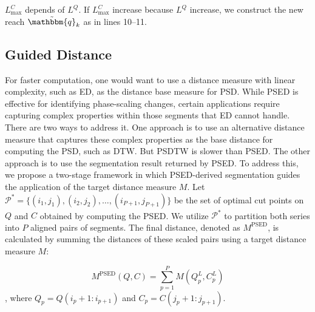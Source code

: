 $L_{\max}^C$ depends of $L^Q$.
If $L_{\max}^C$ increase because $L^Q$ increase, we construct the new reach $\tilde{\mathbbm{q}}_k$ as in lines 10--11.

\subsection{Guided Distance} %

For faster computation, one would want to use a distance measure with linear complexity, such as ED, as the distance base measure for PSD.
While PSED is effective for identifying phase-scaling changes, certain applications require capturing complex properties within those segments that ED cannot handle. 
There are two ways to address it.
One approach is to use an alternative distance measure that captures these complex properties as the base distance for computing the PSD, such as DTW.
But PSDTW is slower than PSED.
The other approach is to use the segmentation result returned by PSED. 
To address this, we propose a two-stage framework in which PSED-derived segmentation guides the application of the target distance measure $M$.
Let $\mathcal{P}^* = \{(i_1, j_1), (i_2, j_2), \dots, (i_{P+1}, j_{P+1})\}$ be the set of optimal cut points on $Q$ and $C$ obtained by computing the PSED. 
We utilize $\mathcal{P}^*$ to partition both series into $P$ aligned pairs of segments. 
The final distance, denoted as $M^{\text{PSED}}$, is calculated by summing the distances of these scaled pairs using a target distance measure $M$:

\begin{equation} 
\label{eq:guided-dist}
M^{\text{PSED}}(Q, C) = \sum_{p=1}^{P} M(Q_{p}^L, C_{p}^L)
\end{equation}
, where $Q_{p} = Q(i_p + 1: i_{p+1})$ and $C_{p} = C(j_p + 1 : j_{p+1})$.


